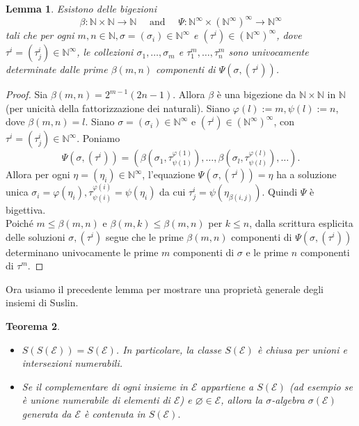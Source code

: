 \documentclass[a4paper, twoside,openright]{article}
\newcommand{\<}{\langle}
\renewcommand{\>}{\rangle}
\newtheorem{teo}{Teorema}[]
\newtheorem{lemma}[teo]{Lemma}
\begin{document}
\begin{lemma}
	Esistono delle bigezioni
	$$	\beta: \mathbb{N} \times \mathbb{N} \rightarrow \mathbb{N} \quad \text { and } \quad \Psi: \mathbb{N}^{\infty} \times\left(\mathbb{N}^{\infty}\right)^{\infty} \rightarrow \mathbb{N}^{\infty}
	$$
	tali che per ogni $m, n \in \mathbb{N}, \sigma=\left(\sigma_{i}\right) \in \mathbb{N}^{\infty}$ e $\left(\tau^{i}\right) \in\left(\mathbb{N}^{\infty}\right)^{\infty}$, dove $\tau^{i}=\left(\tau_{j}^{i}\right) \in \mathbb{N}^{\infty}$, le collezioni $\sigma_{1}, \ldots, \sigma_{m}$ e $\tau_{1}^{m}, \ldots, \tau_{n}^{m}$ sono univocamente determinate dalle prime $\beta(m, n)$ componenti di $\Psi\left(\sigma,\left(\tau^{i}\right)\right)$.
\end{lemma}	

\begin{proof}
	Sia $\beta(m, n)=2^{m-1}(2 n-1)$. Allora $\beta$ è una bigezione da $\mathbb{N} \times \mathbb{N}$ in $\mathbb{N}$ (per unicità della fattorizzazione dei naturali). Siano $\varphi(l):=m, \psi(l):=n$, dove $\beta(m, n)=l$. Siano $\sigma=\left(\sigma_{i}\right) \in \mathbb{N}^{\infty}$ e $\left(\tau^{i}\right) \in\left(\mathbb{N}^{\infty}\right)^{\infty}$, con $\tau^{i}=\left(\tau_{j}^{i}\right) \in \mathbb{N}^{\infty}$. Poniamo
	$$
	\Psi\left(\sigma,\left(\tau^{i}\right)\right)=\left(\beta\left(\sigma_{1}, \tau_{\psi(1)}^{\varphi(1)}\right), \ldots, \beta\left(\sigma_{l}, \tau_{\psi(l)}^{\varphi(l)}\right), \ldots\right) .
	$$
	Allora per ogni $\eta=\left(\eta_{i}\right) \in \mathbb{N}^{\infty}$, l'equazione $\Psi\left(\sigma,\left(\tau^{i}\right)\right)=\eta$ ha a soluzione unica $\sigma_{i}=\varphi\left(\eta_{i}\right),  \tau_{\psi(i)}^{\varphi(i)}=\psi(\eta_i)$ da cui $\tau_{j}^{i}=\psi\left(\eta_{\beta(i, j)}\right)$. Quindi $\Psi$ è bigettiva.\\
	Poiché $m \leq \beta(m, n)$ e $\beta(m, k) \leq \beta(m, n)$ per $k \leq n$, dalla scrittura esplicita delle soluzioni $\sigma, (\tau^i)$ segue che le prime $\beta(m, n)$ componenti di $\Psi\left(\sigma,\left(\tau^{i}\right)\right)$ determinano univocamente le prime $m$ componenti di $\sigma$ e le prime $n$ componenti di $\tau^{m}$.
	
\end{proof}

Ora usiamo il precedente lemma per mostrare una proprietà generale degli insiemi di Suslin.\\

\begin{teo} \label{SE}
	\hfill
	\begin{itemize}
		\item $S(S(\mathcal{E}))=S(\mathcal{E})$. In particolare, la classe $S(\mathcal{E})$ è chiusa per unioni e intersezioni numerabili.
		\item Se il complementare di ogni insieme in $\mathcal{E}$ appartiene a $S(\mathcal{E})$ (ad esempio se è unione numerabile di elementi di $\mathcal{E}$) e $\varnothing \in \mathcal{E}$, allora la $\sigma$-algebra $\sigma(\mathcal{E})$ generata da $\mathcal{E}$ è contenuta in $S(\mathcal{E}).$
	\end{itemize}
\end{teo}
\end{document}
